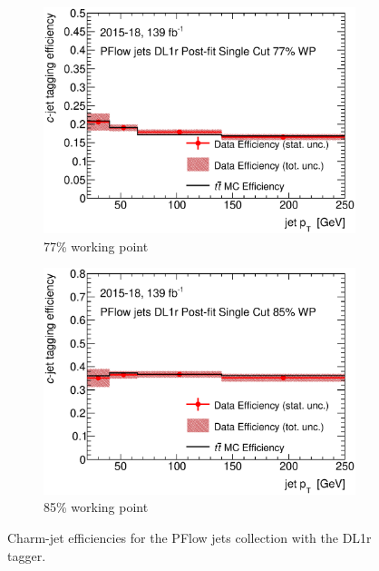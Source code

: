 \documentclass[letterpaper,12pt]{article}
\begin{document}
\begin{figure}[H]
\begin{subfigure}[t]{.35\linewidth}
		\includegraphics[width=1\textwidth]{FTAG_plots/DL1rallPFlowDec/eff77.eps}
		\caption{77\% working point}
		\end{subfigure}
		\begin{subfigure}[t]{.35\linewidth}
		\includegraphics[width=1\textwidth]{FTAG_plots/DL1rallPFlowDec/eff85.eps}
		\caption{85\% working point}
		\end{subfigure}
		\caption{Charm-jet efficiencies for the PFlow jets collection with
	the DL1r tagger.} \label{fig:Dec_eff_PFlow_DL1r}
\end{figure}
\end{document}

